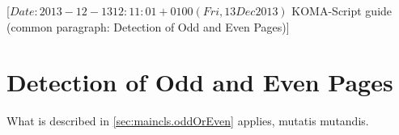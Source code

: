 %
%
%
%
%
%
%
%
% 
%
%
%
%

                 [$Date: 2013-12-13 12:11:01 +0100 (Fri, 13 Dec 2013) $
                  KOMA-Script guide (common paragraph: Detection of Odd and
                                     Even Pages)]


\makeatletter
{}%
%
%
%
\makeatother


\section{Detection of Odd and Even Pages}
\label{sec:\csname label@base\endcsname.oddOrEven}%
\ifshortversion\IgnoreThisfalse{}\fi%
\ifIgnoreThis %
What is described in
\autoref{sec:maincls.oddOrEven} applies, mutatis mutandis.
\else %
%
%


